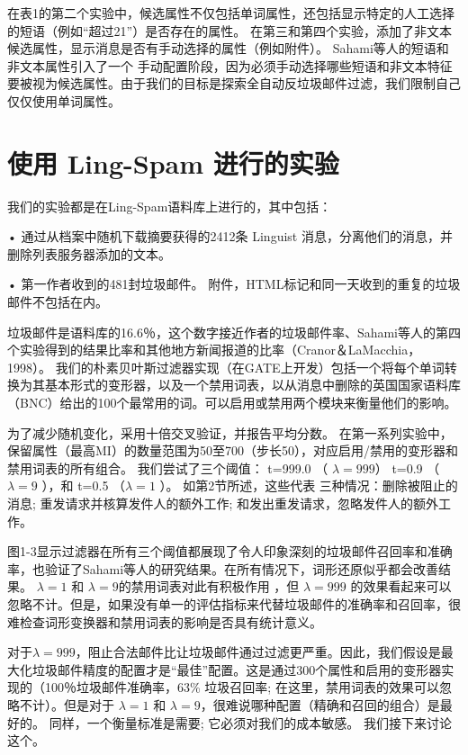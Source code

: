 \documentclass[UTF8]{ctexart}
\begin{document}
在表1的第二个实验中，候选属性不仅包括单词属性，还包括显示特定的人工选择的短语（例如“超过21”）是否存在的属性。 在第三和第四个实验，添加了非文本候选属性，显示消息是否有手动选择的属性（例如附件）。 Sahami等人的短语和非文本属性引入了一个 手动配置阶段，因为必须手动选择哪些短语和非文本特征要被视为候选属性。由于我们的目标是探索全自动反垃圾邮件过滤，我们限制自己仅仅使用单词属性。

\section{使用 Ling-Spam 进行的实验}
我们的实验都是在Ling-Spam语料库上进行的，其中包括：

• 通过从档案中随机下载摘要获得的2412条 Linguist 消息，分离他们的消息，并删除列表服务器添加的文本。

• 第一作者收到的481封垃圾邮件。 附件，HTML标记和同一天收到的重复的垃圾邮件不包括在内。

垃圾邮件是语料库的16.6％，这个数字接近作者的垃圾邮件率、Sahami等人的第四个实验得到的结果比率和其他地方新闻报道的比率（Cranor＆LaMacchia，1998）。
我们的朴素贝叶斯过滤器实现（在GATE上开发）包括一个将每个单词转换为其基本形式的变形器，以及一个禁用词表，以从消息中删除的英国国家语料库（BNC）给出的100个最常用的词。可以启用或禁用两个模块来衡量他们的影响。

为了减少随机变化，采用十倍交叉验证，并报告平均分数。 在第一系列实验中，保留属性（最高MI）的数量范围为50至700（步长50），对应启用/禁用的变形器和禁用词表的所有组合。 我们尝试了三个阈值： t=999.0  （ $\lambda=999 $） t=0.9 （ $\lambda=9$ ），和 t=0.5 （$\lambda=1$ ）。 如第2节所述，这些代表 三种情况：删除被阻止的消息; 重发请求并核算发件人的额外工作; 和发出重发请求，忽略发件人的额外工作。

图1-3显示过滤器在所有三个阈值都展现了令人印象深刻的垃圾邮件召回率和准确率，也验证了Sahami等人的研究结果。在所有情况下，词形还原似乎都会改善结果。 $\lambda=1$ 和  $\lambda=9$的禁用词表对此有积极作用 ，但 $\lambda =999$ 的效果看起来可以忽略不计。但是，如果没有单一的评估指标来代替垃圾邮件的准确率和召回率，很难检查词形变换器和禁用词表的影响是否具有统计意义。

对于$ \lambda=999$，阻止合法邮件比让垃圾邮件通过过滤更严重。因此，我们假设是最大化垃圾邮件精度的配置才是“最佳”配置。这是通过300个属性和启用的变形器实现的（100％垃圾邮件准确率，63\% 垃圾召回率; 在这里，禁用词表的效果可以忽略不计）。但是对于 $\lambda=1$ 和 $\lambda=9$，很难说哪种配置（精确和召回的组合）是最好的。 同样，一个衡量标准是需要; 它必须对我们的成本敏感。 我们接下来讨论这个。
\end{document}
